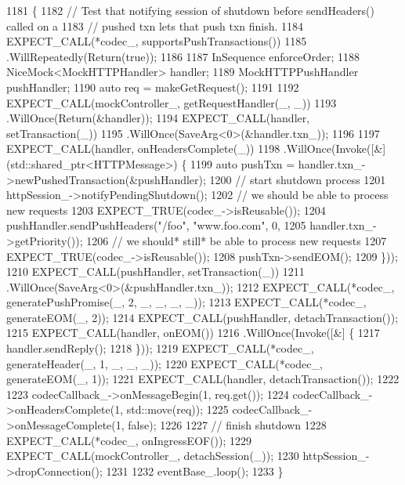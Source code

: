 \begin{DoxyCode}
1181                                                              \{
1182   \textcolor{comment}{// Test that notifying session of shutdown before sendHeaders() called on a}
1183   \textcolor{comment}{// pushed txn lets that push txn finish.}
1184   EXPECT\_CALL(*codec\_, supportsPushTransactions())
1185     .WillRepeatedly(Return(\textcolor{keyword}{true}));
1186 
1187   InSequence enforceOrder;
1188   NiceMock<MockHTTPHandler> handler;
1189   MockHTTPPushHandler pushHandler;
1190   \textcolor{keyword}{auto} req = makeGetRequest();
1191 
1192   EXPECT\_CALL(mockController\_, getRequestHandler(\_, \_))
1193     .WillOnce(Return(&handler));
1194   EXPECT\_CALL(handler, setTransaction(\_))
1195     .WillOnce(SaveArg<0>(&handler.txn\_));
1196 
1197   EXPECT\_CALL(handler, onHeadersComplete(\_))
1198     .WillOnce(Invoke([&] (std::shared\_ptr<HTTPMessage>) \{
1199           \textcolor{keyword}{auto} pushTxn = handler.txn\_->newPushedTransaction(&pushHandler);
1200           \textcolor{comment}{// start shutdown process}
1201           httpSession\_->notifyPendingShutdown();
1202           \textcolor{comment}{// we should be able to process new requests}
1203           EXPECT\_TRUE(codec\_->isReusable());
1204           pushHandler.sendPushHeaders(\textcolor{stringliteral}{"/foo"}, \textcolor{stringliteral}{"www.foo.com"}, 0,
1205                                       handler.txn\_->getPriority());
1206           \textcolor{comment}{// we should* still* be able to process new requests}
1207           EXPECT\_TRUE(codec\_->isReusable());
1208           pushTxn->sendEOM();
1209         \}));
1210   EXPECT\_CALL(pushHandler, setTransaction(\_))
1211     .WillOnce(SaveArg<0>(&pushHandler.txn_));
1212   EXPECT\_CALL(*codec\_, generatePushPromise(\_, 2, \_, \_, \_, \_));
1213   EXPECT\_CALL(*codec\_, generateEOM(\_, 2));
1214   EXPECT\_CALL(pushHandler, detachTransaction());
1215   EXPECT\_CALL(handler, onEOM())
1216     .WillOnce(Invoke([&] \{
1217           handler.sendReply();
1218         \}));
1219   EXPECT\_CALL(*codec\_, generateHeader(\_, 1, \_, \_, \_));
1220   EXPECT\_CALL(*codec\_, generateEOM(\_, 1));
1221   EXPECT\_CALL(handler, detachTransaction());
1222 
1223   codecCallback\_->onMessageBegin(1, req.get());
1224   codecCallback\_->onHeadersComplete(1, std::move(req));
1225   codecCallback\_->onMessageComplete(1, \textcolor{keyword}{false});
1226 
1227   \textcolor{comment}{// finish shutdown}
1228   EXPECT\_CALL(*codec\_, onIngressEOF());
1229   EXPECT\_CALL(mockController\_, detachSession(\_));
1230   httpSession\_->dropConnection();
1231 
1232   eventBase\_.loop();
1233 \}
\end{DoxyCode}
